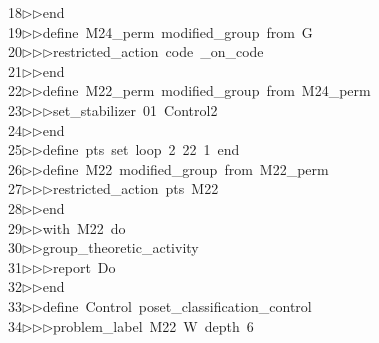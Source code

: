 \begin{tabbing}
18\>$\triangleright$\>$\triangleright$\>end\ \\[0pt]
19\>$\triangleright$\>$\triangleright$\>define\ M24\_perm\ modified\_group\ from\ G\ \\[0pt]
20\>$\triangleright$\>$\triangleright$\>$\triangleright$\>restricted\_action\ code\ \_on\_code\ \\[0pt]
21\>$\triangleright$\>$\triangleright$\>end\ \\[0pt]
22\>$\triangleright$\>$\triangleright$\>define\ M22\_perm\ modified\_group\ from\ M24\_perm\ \\[0pt]
23\>$\triangleright$\>$\triangleright$\>$\triangleright$\>set\_stabilizer\ 01\ Control2\ \\[0pt]
24\>$\triangleright$\>$\triangleright$\>end\ \\[0pt]
25\>$\triangleright$\>$\triangleright$\>define\ pts\ set\ loop\ 2\ 22\ 1\ end\ \\[0pt]
26\>$\triangleright$\>$\triangleright$\>define\ M22\ modified\_group\ from\ M22\_perm\ \\[0pt]
27\>$\triangleright$\>$\triangleright$\>$\triangleright$\>restricted\_action\ pts\ M22\ \\[0pt]
28\>$\triangleright$\>$\triangleright$\>end\ \\[0pt]
29\>$\triangleright$\>$\triangleright$\>with\ M22\ do\ \\[0pt]
30\>$\triangleright$\>$\triangleright$\>group\_theoretic\_activity\ \\[0pt]
31\>$\triangleright$\>$\triangleright$\>$\triangleright$\>report\ Do\ \\[0pt]
32\>$\triangleright$\>$\triangleright$\>end\ \\[0pt]
33\>$\triangleright$\>$\triangleright$\>define\ Control\ poset\_classification\_control\ \\[0pt]
34\>$\triangleright$\>$\triangleright$\>$\triangleright$\>problem\_label\ M22\ W\ depth\ 6\ \\[0pt]

\end{tabbing}
